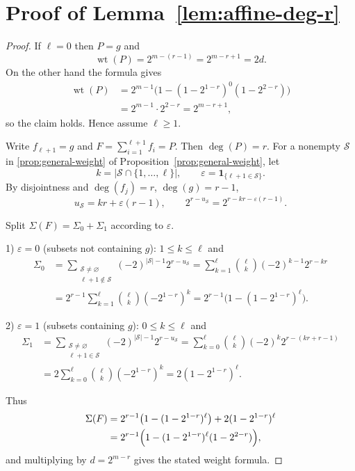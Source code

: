 \documentclass[conference]{IEEEtran}
\theoremstyle{definition}
\newcommand{\wt}{\operatorname{wt}}
\begin{document}
\section*{Proof of Lemma~\ref{lem:affine-deg-r}}
\begin{proof}
If $\ell=0$ then $P=g$ and
\[
\wt(P)=2^{m-(r-1)}=2^{m-r+1}=2d.
\]
On the other hand the formula gives
\[
\begin{aligned}
\wt(P)
&=
2^{m-1}\bigl(1-(1-2^{1-r})^{0}(1-2^{2-r})\bigr)\\
&=
2^{m-1}\cdot 2^{2-r}
=
2^{m-r+1},
\end{aligned}
\]
so the claim holds. Hence assume $\ell\ge1$.

Write $f_{\ell+1}=g$ and $F=\sum_{i=1}^{\ell+1} f_i=P$. Then
$\deg(P)=r$.  
For a nonempty $\mathcal S$ in \eqref{prop:general-weight} of Proposition~\ref{prop:general-weight}, let
\[
k=|\mathcal S\cap\{1,\dots,\ell\}|,\qquad
\varepsilon=\mathbf 1_{\{\ell+1\in\mathcal S\}}.
\]
By disjointness and $\deg(f_j)=r$, $\deg(g)=r-1$,
\[
u_{\mathcal S}=kr+\varepsilon(r-1),
\qquad
2^{r-u_{\mathcal S}}=2^{r-kr-\varepsilon(r-1)}.
\]

Split $\Sigma(F)=\Sigma_0+\Sigma_1$ according to $\varepsilon$.

1) $\varepsilon=0$ (subsets not containing $g$): $1\le k\le\ell$ and
\[
\begin{aligned}
\Sigma_0
&=
\sum_{\substack{\mathcal S\neq\varnothing\\\ell+1\notin\mathcal S}}
(-2)^{|\mathcal S|-1}2^{r-u_{\mathcal S}}
=
\sum_{k=1}^{\ell}\binom{\ell}{k}
(-2)^{k-1}2^{r-kr}
\\
&=
2^{r-1}\sum_{k=1}^{\ell}\binom{\ell}{k}(-2^{1-r})^k
=
2^{r-1}\bigl(1-(1-2^{1-r})^{\ell}\bigr).
\end{aligned}
\]

2) $\varepsilon=1$ (subsets containing $g$): $0\le k\le\ell$ and
\[
\begin{aligned}
\Sigma_1
&=
\sum_{\substack{\mathcal S\neq\varnothing\\\ell+1\in\mathcal S}}
(-2)^{|\mathcal S|-1}2^{r-u_{\mathcal S}}
=
\sum_{k=0}^{\ell}\binom{\ell}{k}
(-2)^k 2^{r-(kr+r-1)}\\
&=
2\sum_{k=0}^{\ell}\binom{\ell}{k}(-2^{1-r})^k
=
2(1-2^{1-r})^{\ell}.
\end{aligned}
\]

Thus
\[
\begin{aligned}
\Sigma(F)
&=
2^{r-1}\bigl(1-(1-2^{1-r})^{\ell}\bigr)
+2(1-2^{1-r})^{\ell}\\
&=
2^{r-1}
\Bigl(
  1-(1-2^{1-r})^{\ell}(1-2^{2-r})
\Bigr),
\end{aligned}
\]
and multiplying by $d=2^{m-r}$ gives the stated weight formula.
\end{proof}
\end{document}

